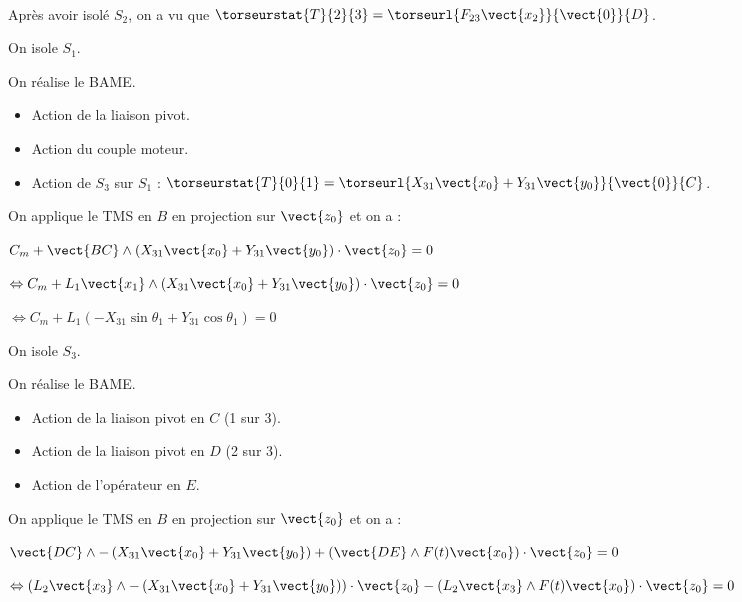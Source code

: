 \ifdifficile
{}
\ifprof
\begin{corrige}~\\
Après avoir isolé $S_2$, on a vu que $\torseurstat{T}{2}{3}=\torseurl{F_{23}\vect{x_2}}{\vect{0}}{D}$.


\vspace{.5cm} 

On isole $S_1$.

On réalise le BAME.
\begin{itemize}
\item Action de la liaison pivot. 
\item Action du couple moteur.
\item Action de $S_3$ sur $S_1$ : $\torseurstat{T}{0}{1}=\torseurl{X_{31}\vect{x_0}+Y_{31}\vect{y_0}}{\vect{0}}{C}$. 
\end{itemize}

On applique le TMS en $B$ en projection sur $\vect{z_0}$ et on a : 

$C_m + \vect{BC}\wedge\left(X_{31}\vect{x_0}+Y_{31}\vect{y_0} \right) \cdot\vect{z_0}=0$

$\Leftrightarrow C_m + L_1\vect{x_1}\wedge\left(X_{31}\vect{x_0}+Y_{31}\vect{y_0} \right) \cdot\vect{z_0}=0$

$\Leftrightarrow C_m + L_1\left(-X_{31}\sin \theta_1+Y_{31} \cos \theta_1 \right) =0$


\vspace{.5cm} 

On isole $S_3$.

On réalise le BAME.
\begin{itemize}
\item Action de la liaison pivot en $C$ (1 sur 3). 
\item Action de la liaison pivot en $D$ (2 sur 3). 
\item Action de l'opérateur en $E$.
\end{itemize}

On applique le TMS en $B$ en projection sur $\vect{z_0}$ et on a : 

$\vect{DC}\wedge-\left(X_{31}\vect{x_0}+Y_{31}\vect{y_0} \right) +\left(\vect{DE}\wedge F(t)\vect{x_0} \right)\cdot\vect{z_0}=0$

$\Leftrightarrow\left( L_2\vect{x_3}\wedge-\left(X_{31}\vect{x_0}+Y_{31}\vect{y_0} \right) \right) \cdot\vect{z_0}-\left(L_2\vect{x_3}\wedge F(t)\vect{x_0}\right)\cdot\vect{z_0}=0$


\end{corrige}

